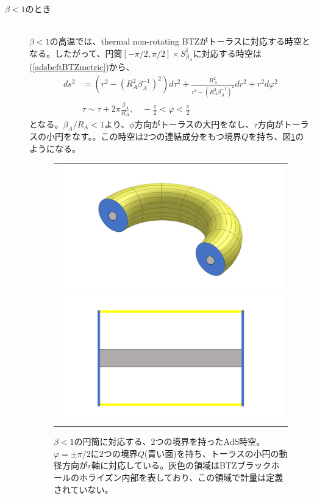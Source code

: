 \begin{description}
\item[$\beta<1$のとき] \hfill\\
$\beta<1$の高温では、thermal non-rotating BTZがトーラスに対応する時空となる。したがって、円筒$[-\pi/2,\pi/2]\times S_{\beta_A}^1$に対応する時空は(\ref{adsbcftBTZmetric})から、
\begin{align}
ds^2&=(r^2-(R_A^2\beta_A^{-1})^2)d\tau^2+\frac{R_A^2}{r^2-(R_A^2\beta_A^{-1})^2}dr^2+r^2d\varphi^2\\
&\tau\sim \tau+2\pi\frac{\beta_A}{R_A},\quad -\frac{\pi}{2}<\varphi<\frac{\pi}{2} 
\end{align}
となる。$\beta_A/R_A<1$より、$\phi$方向がトーラスの大円をなし、$\tau$方向がトーラスの小円をなす。。この時空は$2$つの連結成分をもつ境界$Q$を持ち、図\ref{fig:adsbcftbtz}のようになる。
\begin{figure}[h]
	\centering
	\begin{tabular}{c}
	\begin{minipage}{0.50\hsize}
		\centering
		\includegraphics[width=\linewidth]{adsbcftBTZ.pdf}
		\caption{$\beta<1$の円筒に対応する、$2$つの境界を持ったAdS時空。$\varphi=\pm\pi/2$に$2$つの境界$Q$(青い面)を持ち、トーラスの小円の動径方向が$r$軸に対応している。灰色の領域はBTZブラックホールのホライズン内部を表しており、この領域で計量は定義されていない。}
		\label{fig:adsbcftbtz}
	\end{minipage}
	\begin{minipage}{0.50\hsize}
		\centering
		\includegraphics[width=\linewidth]{adsbcftBTZsection.pdf}

\end{minipage}
\end{tabular}
\end{figure}
\end{description}
